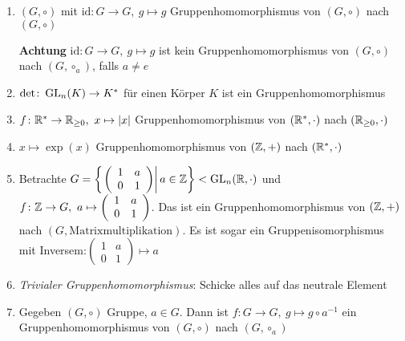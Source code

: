 \documentclass[12pt,a4paper]{scrartcl}
\begin{document}
\begin{bsp}[Gruppenhomomorphismus]
	\leavevmode
	\begin{enumerate}
		\item $(G,\circ)$ mit $\mbox{id}\colon G\to G,\ g\mapsto g$ Gruppenhomomorphismus von $(G,\circ)$ nach $(G,\circ)$
		
		\textbf{Achtung} $\mbox{id}\colon G\to G,\ g\mapsto g$ ist kein Gruppenhomomorphismus von $(G,\circ)$ nach $(G,\circ_a)$, falls $a\neq e$
		
		\item $\det\colon \operatorname{GL}_n(K)\to K^*$ für einen Körper $K$ ist ein Gruppenhomomorphismus
		\item $f\colon \IR^*\to \IR_{\geq 0},\ x\mapsto |x|$ Gruppenhomomorphismus von $(\mathbb R^*,\cdot)$ nach $(\mathbb R_{\geq 0}, \cdot)$
		\item $x\mapsto \exp(x)$ Gruppenhomomorphismus von $(\mathbb Z,+)$ nach $(\mathbb R^*,\cdot)$
		\item Betrachte $G = \left\{\left.\left(\begin{array}{cc}
		1 & a \\ 
		0 & 1
		\end{array} \right)\right\vert a\in\mathbb Z\right\}<\operatorname{GL}_n(\mathbb R,\cdot)$ und $f\colon \mathbb Z\to G,\ a\mapsto\left(\begin{array}{cc}
		1 & a \\ 
		0 & 1
		\end{array} \right)$. Das ist ein Gruppenhomomorphismus von $(\mathbb Z,+)$ nach $(G,\mbox{Matrixmultiplikation})$. Es ist sogar ein Gruppenisomorphismus mit Inversem:$\left(\begin{array}{cc}
		1 & a \\ 
		0 & 1
		\end{array} \right)\mapsto a$
		\item \textit{Trivialer Gruppenhomomorphismus}: Schicke alles auf das neutrale Element
		\item Gegeben $(G,\circ)$ Gruppe, $a\in G$. Dann ist $f\colon G\to G,\ g\mapsto g\circ a^{-1}$ ein Gruppenhomomorphismus von $(G,\circ)$ nach $(G,\circ_a)$
	\end{enumerate}
\end{bsp}
\end{document}
